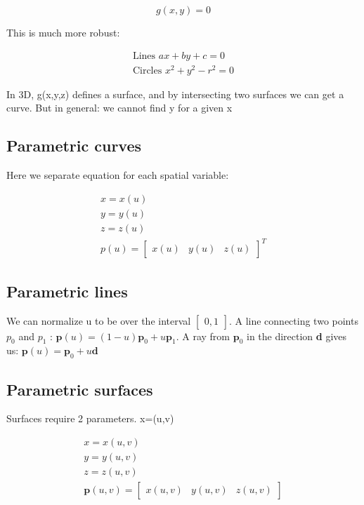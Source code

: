 		\begin{equation}
			g(x,y) = 0
		\end{equation}

	This is much more robust:

		\begin{equation}
		\begin{aligned}
			\text{Lines } ax+by+c =0 \\
			\text{Circles } x^{2} + y^{2} - r^{2} = 0
		\end{aligned}
		\end{equation}

	In 3D, g(x,y,z) defines a surface, and by intersecting two surfaces we can get a curve. But in general: we cannot find y for a given x

	\subsection*{Parametric curves}
	Here we separate equation for each spatial variable:

		\begin{equation}
		\begin{aligned}
			x = x(u) \\ y = y(u) \\ z = z(u) \\ p(u) = \begin{bmatrix} x(u)& y(u)& z(u) \end{bmatrix}^{T}
		\end{aligned}
		\end{equation}

	\subsection*{Parametric lines}
	
	We can normalize u to be over the interval $\begin{bmatrix} 0,1 \end{bmatrix}$. A line connecting two points $p_0$ and $p_1$ : $\textbf{p}(u) = (1-u)\textbf{p}_0 + u \textbf{p}_1$. A ray from $\textbf{p}_0$ in the direction \textbf{d} gives us: $\textbf{p}(u) = \textbf{p}_0 +u \textbf{d}$

	\subsection*{Parametric surfaces}
	Surfaces require 2 parameters. x=(u,v)

		\begin{equation}
		\begin{aligned}
			x=x(u,v) \\ y =y(u,v) \\ z =z(u,v) \\ \textbf{p}(u,v) = \begin{bmatrix} x(u,v)& y(u,v)& z(u,v) \end{bmatrix}
		\end{aligned}
		\end{equation}

